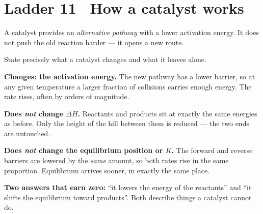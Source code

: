 \documentclass{apchem-worksheet}
\begin{document}
\section*{\sffamily Ladder 11 \textbullet\ How a catalyst works}

A catalyst provides an \emph{alternative pathway} with a lower activation
energy. It does not push the old reaction harder --- it opens a new route.

\begin{workedexample}
State precisely what a catalyst changes and what it leaves alone.

\textbf{Changes: the activation energy.} The new pathway has a lower
barrier, so at any given temperature a larger fraction of collisions
carries enough energy. The rate rises, often by orders of magnitude.

\textbf{Does \emph{not} change $\Delta H$.} Reactants and products sit at
exactly the same energies as before. Only the height of the hill between
them is reduced --- the two ends are untouched.

\textbf{Does \emph{not} change the equilibrium position or $K$.} The
forward and reverse barriers are lowered by the \emph{same} amount, so
both rates rise in the same proportion. Equilibrium arrives sooner, in
exactly the same place.

\textbf{Two answers that earn zero:} ``it lowers the energy of the
reactants'' and ``it shifts the equilibrium toward products''. Both
describe things a catalyst cannot do.
\end{workedexample}
\end{document}
